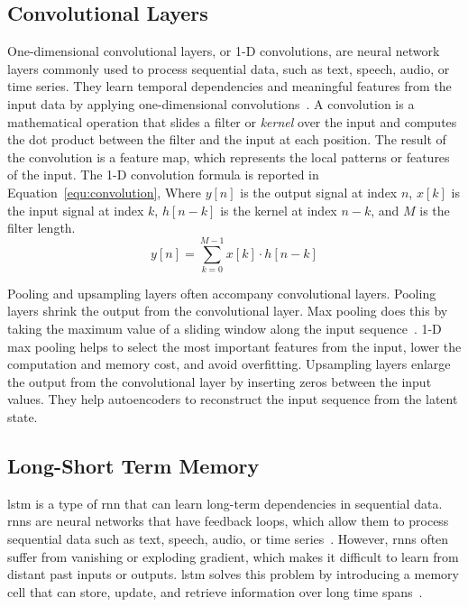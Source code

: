 \subsection{Convolutional Layers}

One-dimensional convolutional layers, or 1-D convolutions, are neural network layers commonly used to process sequential data, such as text, speech, audio, or time series. They learn temporal dependencies and meaningful features from the input data by applying one-dimensional convolutions~\parencite{kiranyaz_1d_2021}. A convolution is a mathematical operation that slides a filter or \textit{kernel} over the input and computes the dot product between the filter and the input at each position. The result of the convolution is a feature map, which represents the local patterns or features of the input. The 1-D convolution formula is reported in Equation~\eqref{equ:convolution}, Where $y[n]$ is the output signal at index $n$, $x[k]$ is the input signal at index $k$, $h[n-k]$ is the kernel at index $n-k$, and $M$ is the filter length.
\begin{equation}\label{equ:convolution}
    y[n] = \sum_{k=0}^{M-1} x[k] \cdot h[n-k]
\end{equation}

Pooling and upsampling layers often accompany convolutional layers. Pooling layers shrink the output from the convolutional layer. Max pooling does this by taking the maximum value of a sliding window along the input sequence~\parencite{ahmad_deep_2019}. 1-D max pooling helps to select the most important features from the input, lower the computation and memory cost, and avoid overfitting. Upsampling layers enlarge the output from the convolutional layer by inserting zeros between the input values. They help autoencoders to reconstruct the input sequence from the latent state.

\subsection{Long-Short Term Memory}

\acrfull{lstm} is a type of \acrfull{rnn} that can learn long-term dependencies in sequential data. \acrshort{rnn}s are neural networks that have feedback loops, which allow them to process sequential data such as text, speech, audio, or time series~\parencite{ahmad_deep_2019}. However, \acrshort{rnn}s often suffer from vanishing or exploding gradient, which makes it difficult to learn from distant past inputs or outputs. \acrshort{lstm} solves this problem by introducing a memory cell that can store, update, and retrieve information over long time spans~\parencite{hochreiter_long_1997}.

